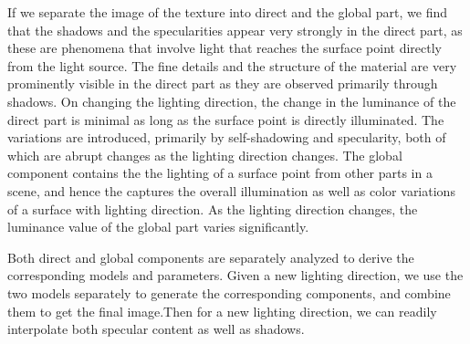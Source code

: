 If we separate the image of the texture into direct and the global part, we find
that the shadows and the specularities appear very strongly in the direct part,
as these are phenomena that involve light that reaches the surface point
directly from the light source. The fine details and the structure of the
material are very prominently visible in the direct part as they are observed
primarily through shadows. On changing the lighting direction, the change in the
luminance of the direct part is minimal as long as the surface point is directly
illuminated. The variations are introduced, primarily by self-shadowing and
specularity, both of which are abrupt changes as the lighting direction changes.
The global component contains the the lighting of a surface point from other
parts in a scene, and hence the captures the overall illumination as well as
color variations of a surface with lighting direction. As the lighting direction
changes, the luminance value of the global part varies significantly.

Both direct and global components are separately analyzed to derive the
corresponding models and parameters. Given a new lighting direction, we use the
two models separately to generate the corresponding components, and combine them
to get the final image.Then for a new lighting direction, we can readily
interpolate both specular content as well as shadows.
% 

